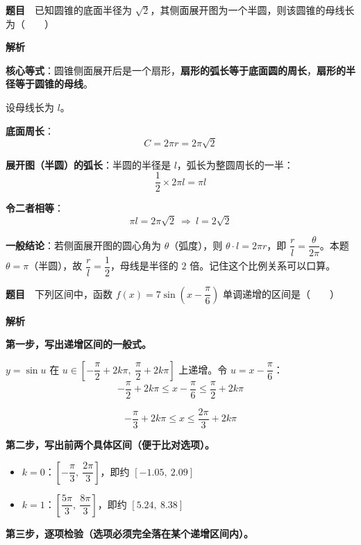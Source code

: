
\par\medskip


\textbf{题目}　已知圆锥的底面半径为 $\sqrt2$，其侧面展开图为一个半圆，则该圆锥的母线长为（　　）

\textbf{解析}

\textbf{核心等式}：圆锥侧面展开后是一个扇形，\textbf{扇形的弧长等于底面圆的周长}，\textbf{扇形的半径等于圆锥的母线}。

设母线长为 $l$。

\textbf{底面周长}：
\[C=2\pi r=2\pi\sqrt2\]

\textbf{展开图（半圆）的弧长}：半圆的半径是 $l$，弧长为整圆周长的一半：
\[\frac12\times2\pi l=\pi l\]

\textbf{令二者相等}：
\[\pi l=2\pi\sqrt2\ \Longrightarrow\ l=2\sqrt2\]


\begin{gktip}
\textbf{一般结论}：若侧面展开图的圆心角为 $\theta$（弧度），则 $\theta\cdot l=2\pi r$，即 $\dfrac rl=\dfrac\theta{2\pi}$。本题 $\theta=\pi$（半圆），故 $\dfrac rl=\dfrac12$，母线是半径的 $2$ 倍。记住这个比例关系可以口算。
\end{gktip}

\par\medskip


\textbf{题目}　下列区间中，函数 $f(x)=7\sin\left(x-\dfrac\pi6\right)$ 单调递增的区间是（　　）

\textbf{解析}

\textbf{第一步，写出递增区间的一般式。}

$y=\sin u$ 在 $u\in\left[-\dfrac\pi2+2k\pi,\ \dfrac\pi2+2k\pi\right]$ 上递增。令 $u=x-\dfrac\pi6$：
\[-\frac\pi2+2k\pi\le x-\frac\pi6\le\frac\pi2+2k\pi\]

\[-\frac\pi3+2k\pi\le x\le\frac{2\pi}3+2k\pi\]

\textbf{第二步，写出前两个具体区间（便于比对选项）。}

\begin{itemize}
\item $k=0$：$\left[-\dfrac\pi3,\ \dfrac{2\pi}3\right]$，即约 $[-1.05,\ 2.09]$
\item $k=1$：$\left[\dfrac{5\pi}3,\ \dfrac{8\pi}3\right]$，即约 $[5.24,\ 8.38]$
\end{itemize}

\textbf{第三步，逐项检验（选项必须完全落在某个递增区间内）。}


